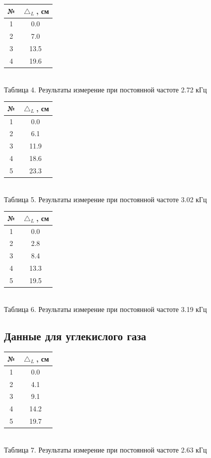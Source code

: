 \documentclass[a4paper, 12pt]{article}
\begin{document}
	\begin{center}
		\begin{tabular} {|c | c |}
			\hline	
			№ & $\bigtriangleup_L$, см\\
			\hline
			1& 0.0\\
			\hline
			2& 7.0\\
			\hline
			3& 13.5\\
			\hline
			4& 19.6\\
			\hline
		\end{tabular}\\
		Таблица 4. Результаты измерение при постоянной частоте 2.72 кГц
	\end{center}

	\begin{center}
		\begin{tabular} {|c | c |}
			\hline	
			№ & $\bigtriangleup_L$, см\\
			\hline
			1& 0.0\\
			\hline
			2& 6.1\\
			\hline
			3& 11.9\\
			\hline
			4& 18.6\\
			\hline
			5& 23.3\\
			\hline
		\end{tabular}\\
		Таблица 5. Результаты измерение при постоянной частоте 3.02 кГц
	\end{center}

	\begin{center}
		\begin{tabular} {|c | c |}
			\hline	
			№ & $\bigtriangleup_L$, см\\
			\hline
			1& 0.0\\
			\hline
			2& 2.8\\
			\hline
			3& 8.4\\
			\hline
			4& 13.3\\
			\hline
			5& 19.5\\
			\hline
		\end{tabular}\\
		Таблица 6. Результаты измерение при постоянной частоте 3.19 кГц
	\end{center}

	\subsection[Carbon]{Данные для углекислого газа}
	
	\begin{center}
		\begin{tabular} {|c | c |}
			\hline	
			№ & $\bigtriangleup_L$, см\\
			\hline
			1& 0.0\\
			\hline
			2& 4.1\\
			\hline
			3& 9.1\\
			\hline
			4& 14.2\\
			\hline
			5& 19.7\\
			\hline
		\end{tabular}\\
		Таблица 7. Результаты измерение при постоянной частоте 2.63 кГц
	\end{center}
\end{document}
